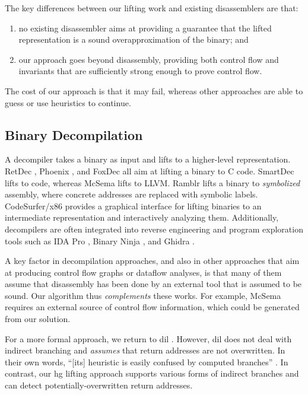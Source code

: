 The key differences between our lifting work and existing disassemblers are that:
\begin{enumerate}
  \item no existing disassembler aims at providing a guarantee that the lifted representation is a sound overapproximation of the binary; and
  \item our approach goes beyond disassembly, providing both control flow and invariants that are sufficiently strong enough to prove control flow.
\end{enumerate}
The cost of our approach is that it may fail, whereas other approaches are able to guess or use heuristics to continue.

\subsection{Binary Decompilation}\label{related-decompilation}
A decompiler takes a binary as input and lifts to a higher-level representation.
RetDec \autocite{retdec}, Phoenix \autocite{brumley2013native}, and FoxDec \autocite{verbeek2020sound} all aim at lifting a binary to C code.
SmartDec \autocite{fokin2011smartdec} lifts to \Cpp{} code, whereas McSema \autocite{dinaburg2014mcsema} lifts to LLVM.
Ramblr \autocite{wang2017ramblr} lifts a binary to \emph{symbolized} assembly, where concrete addresses are replaced with symbolic labels.
CodeSurfer/\gls{x86} \autocite{balakrishnan2004analyzing,balakrishnan2005codesurfer}
provides a graphical interface for lifting binaries to an intermediate representation and interactively analyzing them.
Additionally, decompilers are often integrated into reverse engineering and program exploration tools such as IDA Pro \autocite{ida-decompiler},
Binary Ninja \autocite{binary-ninja-decompiler}, and Ghidra \autocite{ghidra}.

A key factor in decompilation approaches, and also in other approaches that aim at producing control flow graphs or dataflow analyses, is that many of them assume that disassembly has been done by an external tool that is assumed to be sound.
Our algorithm thus \emph{complements} these works.
For example, McSema requires an external source of control flow information, which could be generated from our solution.

For a more formal approach, we return to \ac{dil} \autocite{myreen2007hoare,myreen2012decompilation}.
However, \ac{dil} does not deal with indirect branching and \emph{assumes} that return addresses are not overwritten.
In their own words, ``[its] heuristic is easily confused by computed branches'' \autocite{myreen2008decompilation}.
In contrast, our \ac{hg} lifting approach supports various forms of indirect branches and can detect potentially-overwritten return addresses.


